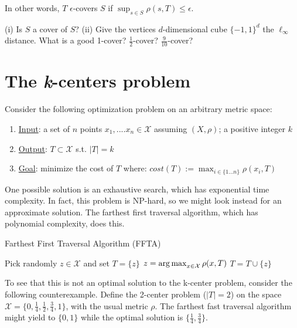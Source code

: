 In other words, $T$ $\epsilon$-covers $S$ if $\sup_{s\in S} 
\rho(s,T)\leq \epsilon$.

\begin{exercise}
(i) Is $S$ a cover of $S$? (ii) Give the vertices $d$-dimensional
cube $\{-1,1\}^d$ the $\ell_\infty$ distance. What is a good 1-cover?
$\frac{1}{2}$-cover? $\frac{9}{10}$-cover?
\end{exercise}

\section{The \emph{k}-centers problem}
Consider the following optimization problem on an arbitrary metric
space:
\begin{enumerate}
\item \underline{Input}: a set of $n$ points $x_1,....x_n \in 
\mathcal{X}$ assuming $(X,\rho)$; a positive integer $k$ 
\item \underline{Output}: $T \subset \mathcal{X}$ s.t. $|T| = k$
\item \underline{Goal}: minimize the cost of $T$ where: $ cost(T)
:= \max_{i \in \{1...n\}} \rho(x_i,T) $
\end{enumerate}

One possible solution is an exhaustive search, which has exponential
time complexity. In fact, this problem is NP-hard, so we might look
instead for an approximate solution. The farthest first traversal
algorithm, which has polynomial complexity, does this.

\begin{algorithm}
\caption{Farthest First Traversal Algorithm (FFTA)}
\begin{algorithmic} 
\STATE Pick randomly $z\in \mathcal{X}$ and set $T = \{z\}$\;
\STATE $z = \operatorname*{\mathrm{arg\,max}}_{x\in \mathcal{X}} \rho(x,T)$ \;
\STATE $T = T \cup \{z\}$\;
\ENDWHILE
\end{algorithmic}
\end{algorithm}

\begin{example}
To see that this is not an optimal solution to the k-center problem,
consider the following counterexample. Define the 2-center problem
($|T| = 2$) on the space $\mathcal{X} = \{0, \frac{1}{4}, \frac{1}{2},
\frac{3}{4}, 1\}$, with the usual metric $\rho$. The farthest fast
traversal algorithm might yield to  $\{0,1\}$ while the optimal
solution is $\{\frac{1}{4},\frac{3}{4}\}$.
\end{example}


